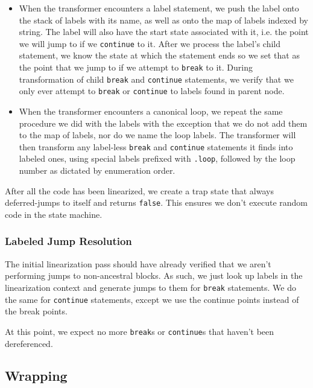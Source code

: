 \documentclass[journal,a4paper]{IEEEtran}
\begin{document}
\begin{itemize}
\item When the transformer encounters a label statement, we push the label onto the stack of labels
with its name, as well as onto the map of labels indexed by string. The label will also have the
start state associated with it, i.e. the point we will jump to if we \texttt{continue} to it. After
we process the label's child statement, we know the state at which the statement ends so we set
that as the point that we jump to if we attempt to \texttt{break} to it. During transformation of
child \texttt{break} and \texttt{continue} statements, we verify that we only ever attempt to
\texttt{break} or \texttt{continue} to labels found in parent node.

\item When the transformer encounters a canonical loop, we repeat the same procedure we did with
the labels with the exception that we do not add them to the map of labels, nor do we name the loop
labels. The transformer will then transform any label-less \texttt{break} and \texttt{continue}
statements it finds into labeled ones, using special labels prefixed with \texttt{.loop}, followed
by the loop number as dictated by enumeration order.
\end{itemize}

After all the code has been linearized, we create a trap state that always deferred-jumps to itself
and returns \texttt{false}. This ensures we don't execute random code in the state machine.

\subsubsection{Labeled Jump Resolution}

The initial linearization pass should have already verified that we aren't performing jumps to
non-ancestral blocks. As such, we just look up labels in the linearization context and generate
jumps to them for \texttt{break} statements. We do the same for \texttt{continue} statements,
except we use the continue points instead of the break points.

At this point, we expect no more \texttt{break}s or \texttt{continue}s that haven't been
dereferenced.

\subsection{Wrapping}
\end{document}
